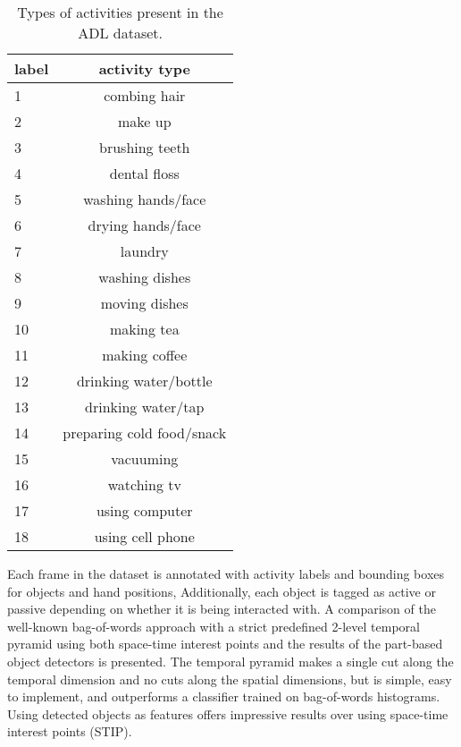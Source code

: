 \documentclass{bmvc2k}
\begin{document}
	\begin{table}
		\begin{center}
			\begin{tabular}{|l|c|}
				\hline \hline
        label & activity type \\
        \hline
        1 & combing hair \\
        \hline
        2 & make up \\
        \hline
        3 & brushing teeth \\
        \hline
        4 & dental floss \\
        \hline
        5 & washing hands/face \\
        \hline
        6 & drying hands/face \\
        \hline
        7 & laundry \\
        \hline
        8 & washing dishes \\
        \hline
        9 & moving dishes \\
        \hline
       10 & making tea \\
        \hline
       11 & making coffee \\
        \hline
       12 & drinking water/bottle \\
        \hline
       13 & drinking water/tap \\
        \hline
       14 & preparing cold food/snack \\
        \hline
       15 & vacuuming \\
        \hline
       16 & watching tv \\
        \hline
       17 & using computer \\
        \hline
       18 & using cell phone \\
				\hline
			\end{tabular}
		\end{center}
		\caption{Types of activities present in the ADL dataset.}
	\end{table}
  
	Each frame in the dataset
	is annotated with activity labels and bounding boxes for objects and hand positions, 
	Additionally, each object is tagged as active or passive depending
	on whether it is being interacted with.
  A comparison of the well-known bag-of-words approach with a strict
  predefined
  2-level temporal pyramid using both space-time interest points and the
  results of the part-based object detectors is presented. The temporal pyramid makes 
  a single cut along the temporal dimension and no cuts along the
  spatial dimensions, but is simple, easy to implement, and outperforms a 
  classifier trained on bag-of-words histograms. Using detected objects as
  features offers impressive results over using space-time interest points
  (STIP).
  
\end{document}
